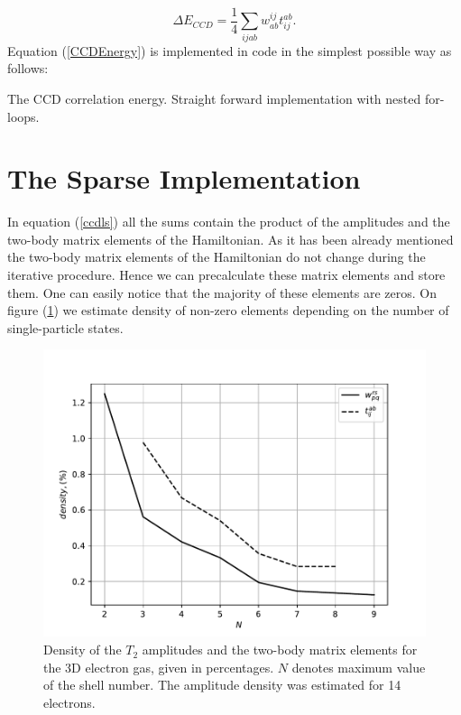 \documentclass[twoside,english]{uiofysmaster}
\begin{document}
\begin{equation}\label{CCDEnergy}
	\Delta E_{CCD} = \frac{1}{4} \sum_{ijab} w_{ab}^{ij} t_{ij}^{ab}.
\end{equation}
Equation (\ref{CCDEnergy}) is implemented in code in the simplest possible way as follows:
\IncMargin{1em}
\begin{algorithm}[H]
	\SetAlgoLined
	
	\BlankLine
	
	\For{$i\leftarrow 1$ \KwTo $N_{\mathrm{Fermi}}$}{
		\For{$j\leftarrow 1$ \KwTo $N_{\mathrm{Fermi}}$}{  %
			\For{$a\leftarrow N_{\mathrm{Fermi}}$ \KwTo $N_{\mathrm{States}}$}{
				\For{$b\leftarrow N_{\mathrm{Fermi}}$ \KwTo $N_{\mathrm{states}}$}{
					CCD Correlation Energy += TBME($i,j,a,b$)*Amplitudes($a,b,i,j$)
				}
			}
		}
	}
	\caption{The CCD correlation energy. Straight forward implementation with nested for-loops.}\label{CCDeltaEBruteForce}
\end{algorithm}\DecMargin{1em}



\section{The Sparse Implementation}
In equation (\ref{ccdls}) all the sums contain the product of the amplitudes and the two-body matrix elements of the Hamiltonian. As it has been already mentioned the two-body matrix elements of the Hamiltonian do not change during the iterative procedure. Hence we can precalculate these matrix elements and store them. One can easily notice that the majority of these elements are zeros. On figure (\ref{fig:density}) we estimate density of non-zero elements depending on the number of single-particle states. 

\begin{figure}[ht!]
\centering
\includegraphics[width=0.7\linewidth]{density}
\caption{Density of the $T_2$ amplitudes and the two-body matrix elements for the 3D electron gas, given in percentages. $N$ denotes maximum value of the shell number. The amplitude density was estimated for 14 electrons.}
\label{fig:density}
\end{figure}
\end{document}

